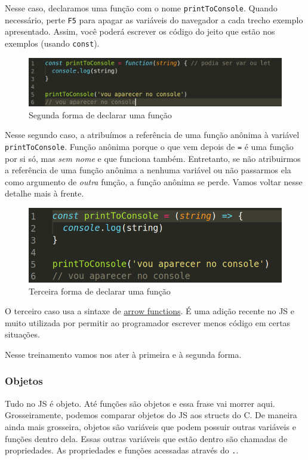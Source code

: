 Nesse caso, declaramos uma função com o nome \texttt{printToConsole}.
Quando necessário, perte \texttt{F5} para apagar as variáveis do navegador a cada trecho
exemplo apresentado. Assim, você poderá escrever os código do jeito que
estão nos exemplos (usando \texttt{const}).


\begin{figure}[h!]
    \centering
    \includegraphics[scale=.4]{imgs/function2.png}
    \caption{ Segunda forma de declarar uma função }
    \label{fig:function2}
\end{figure}

Nesse segundo caso, a atribuímos a referência de uma função anônima à
variável \texttt{printToConsole}. Função anônima porque o que vem depois
de \texttt{=} é uma função por si só, mas \emph{sem nome} e que funciona
também. Entretanto, se não atribuirmos a referência de uma função
anônima a nenhuma variável ou não passarmos ela como argumento de
\emph{outra} função, a função anônima se perde. Vamos voltar nesse
detalhe mais à frente.


\begin{figure}[h!]
    \centering
    \includegraphics[scale=.4]{imgs/function3.png}
    \caption{ Terceira forma de declarar uma função }
    \label{fig:function3}
\end{figure}

O terceiro caso usa a sintaxe de 
\href{https://www.sitepoint.com/es6-arrow-functions-new-fat-concise-syntax-javascript/}{arrow functions}. 
É uma adição recente no JS e muito utilizada por permitir ao programador escrever menos código em certas situações.

Nesse treinamento vamos nos ater à primeira e à segunda forma.

\newpage
\subsubsection{Objetos}
Tudo no JS é objeto. Até funções são objetos e essa frase vai morrer
aqui. Grosseiramente, podemos comparar objetos do JS aos structs do C.
De maneira ainda mais grosseira, objetos são variáveis que podem possuir
outras variáveis e funções dentro dela. Essas outras variáveis que estão
dentro são chamadas de propriedades. As propriedades e funções acessadas
através do \texttt{.}.

